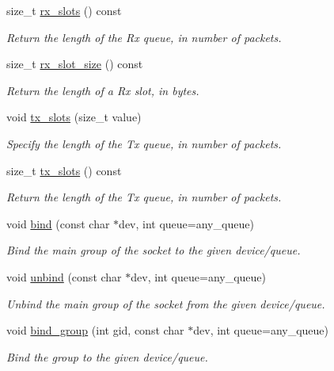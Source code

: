 \begin{DoxyCompactItemize}
size\+\_\+t \hyperlink{classpfq_1_1socket_a0f2205329249eaa7a6229980a744fd2a}{rx\+\_\+slots} () const 
\begin{DoxyCompactList}\small\item\em Return the length of the Rx queue, in number of packets. \end{DoxyCompactList}\item 
size\+\_\+t \hyperlink{classpfq_1_1socket_a8e290b6b1105c22b538d38021d6bfb7d}{rx\+\_\+slot\+\_\+size} () const 
\begin{DoxyCompactList}\small\item\em Return the length of a Rx slot, in bytes. \end{DoxyCompactList}\item 
void \hyperlink{classpfq_1_1socket_a019d15a072c043d6a1333ca0c836da4c}{tx\+\_\+slots} (size\+\_\+t value)
\begin{DoxyCompactList}\small\item\em Specify the length of the Tx queue, in number of packets. \end{DoxyCompactList}\item 
size\+\_\+t \hyperlink{classpfq_1_1socket_a11b91a39fdae65cace365aa3583eba7d}{tx\+\_\+slots} () const 
\begin{DoxyCompactList}\small\item\em Return the length of the Tx queue, in number of packets. \end{DoxyCompactList}\item 
void \hyperlink{classpfq_1_1socket_a3a0fc5c70e2d2615e29d06ac55007ed3}{bind} (const char $\ast$dev, int queue=any\+\_\+queue)
\begin{DoxyCompactList}\small\item\em Bind the main group of the socket to the given device/queue. \end{DoxyCompactList}\item 
void \hyperlink{classpfq_1_1socket_af53d407f46ba2b4d143782ff7d585758}{unbind} (const char $\ast$dev, int queue=any\+\_\+queue)
\begin{DoxyCompactList}\small\item\em Unbind the main group of the socket from the given device/queue. \end{DoxyCompactList}\item 
void \hyperlink{classpfq_1_1socket_a4d4d44cc68af0290e3c494dcd10b1541}{bind\+\_\+group} (int gid, const char $\ast$dev, int queue=any\+\_\+queue)
\begin{DoxyCompactList}\small\item\em Bind the group to the given device/queue. \end{DoxyCompactList}\item 

\end{DoxyCompactItemize}
